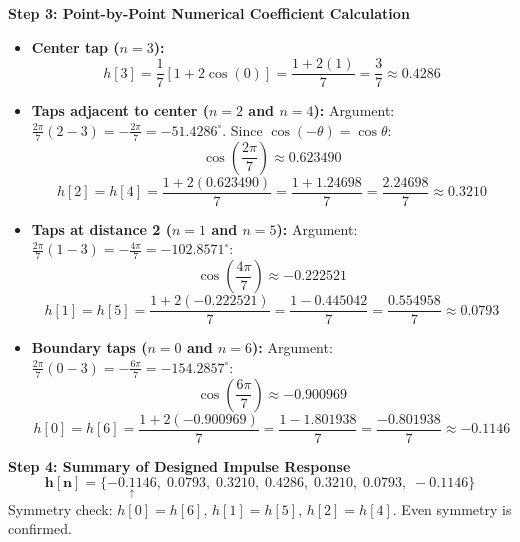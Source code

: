 \documentclass[11pt,a4paper]{article}
\begin{document}
\noindent\textbf{Step 3: Point-by-Point Numerical Coefficient Calculation}
\begin{itemize}
    \item \textbf{Center tap ($n = 3$):}
    \begin{equation}
    h[3] = \frac{1}{7} [1 + 2 \cos(0)] = \frac{1 + 2(1)}{7} = \frac{3}{7} \approx \mathbf{0.4286}
    \end{equation}
    \item \textbf{Taps adjacent to center ($n = 2$ and $n = 4$):}
    Argument: $\frac{2\pi}{7} (2 - 3) = -\frac{2\pi}{7} = -51.4286^\circ$. Since $\cos(-\theta) = \cos\theta$:
    \begin{equation}
    \cos\left(\frac{2\pi}{7}\right) \approx 0.623490
    \end{equation}
    \begin{equation}
    h[2] = h[4] = \frac{1 + 2(0.623490)}{7} = \frac{1 + 1.24698}{7} = \frac{2.24698}{7} \approx \mathbf{0.3210}
    \end{equation}
    \item \textbf{Taps at distance 2 ($n = 1$ and $n = 5$):}
    Argument: $\frac{2\pi}{7} (1 - 3) = -\frac{4\pi}{7} = -102.8571^\circ$:
    \begin{equation}
    \cos\left(\frac{4\pi}{7}\right) \approx -0.222521
    \end{equation}
    \begin{equation}
    h[1] = h[5] = \frac{1 + 2(-0.222521)}{7} = \frac{1 - 0.445042}{7} = \frac{0.554958}{7} \approx \mathbf{0.0793}
    \end{equation}
    \item \textbf{Boundary taps ($n = 0$ and $n = 6$):}
    Argument: $\frac{2\pi}{7} (0 - 3) = -\frac{6\pi}{7} = -154.2857^\circ$:
    \begin{equation}
    \cos\left(\frac{6\pi}{7}\right) \approx -0.900969
    \end{equation}
    \begin{equation}
    h[0] = h[6] = \frac{1 + 2(-0.900969)}{7} = \frac{1 - 1.801938}{7} = \frac{-0.801938}{7} \approx \mathbf{-0.1146}
    \end{equation}
\end{itemize}

\noindent\textbf{Step 4: Summary of Designed Impulse Response}
\begin{equation}
\mathbf{h[n] = \{ \underset{\uparrow}{-0.1146}, \; 0.0793, \; 0.3210, \; 0.4286, \; 0.3210, \; 0.0793, \; -0.1146 \}}
\end{equation}
Symmetry check: $h[0] = h[6]$, $h[1] = h[5]$, $h[2] = h[4]$. Even symmetry is confirmed.
\end{document}
